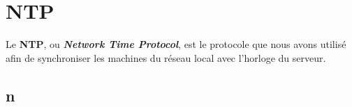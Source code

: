 \section{NTP}
\label{sec:ntp}

Le \textbf{NTP}, ou \textit{\textbf{Network Time Protocol}}, est le protocole que nous
avons utilisé afin de synchroniser les machines du réseau local avec l'horloge
du serveur.


\subsection{n}
\label{subsec:n}
